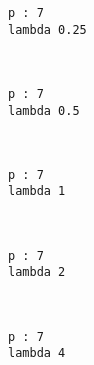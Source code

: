 \documentclass[11pt]{article}
\begin{document}
    \begin{Verbatim}[commandchars=\\\{\}]
p : 7
lambda 0.25

    \end{Verbatim}

    \begin{center}
    \end{center}
    { \hspace*{\fill} \\}
    
    \begin{Verbatim}[commandchars=\\\{\}]
p : 7
lambda 0.5

    \end{Verbatim}

    \begin{center}
    \end{center}
    { \hspace*{\fill} \\}
    
    \begin{Verbatim}[commandchars=\\\{\}]
p : 7
lambda 1

    \end{Verbatim}

    \begin{center}
    \end{center}
    { \hspace*{\fill} \\}
    
    \begin{Verbatim}[commandchars=\\\{\}]
p : 7
lambda 2

    \end{Verbatim}

    \begin{center}
    \end{center}
    { \hspace*{\fill} \\}
    
    \begin{Verbatim}[commandchars=\\\{\}]
p : 7
lambda 4

    \end{Verbatim}
\end{document}
